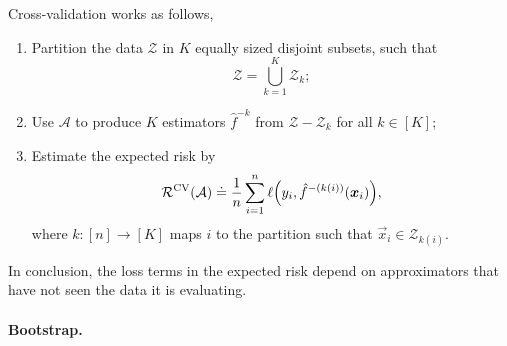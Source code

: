 Cross-validation works as follows,
\begin{enumerate}
    \item Partition the data $\mathcal{Z}$ in $K$ equally sized disjoint subsets, such that \[
              \mathcal{Z} = \bigcup_{k=1}^K \mathcal{Z}_k;
          \]
    \item Use $\mathcal{A}$ to produce $K$ estimators $\hat{f}^{-k}$ from $\mathcal{Z} - \mathcal{Z}_k$ for
          all $k \in [K]$;
    \item Estimate the expected risk by \[
              \mathcal{R}^{\mathrm{CV}}(\mathcal{A}) \doteq \frac{1}{n} \sum_{i=1}^{n} \ell\lft(y_i, \hat{f}^{-(k(i))}(\vec{x}_i)\rgt),
          \]
          where $k: [n] \to [K]$ maps $i$ to the partition such that $\vec{x}_i \in \mathcal{Z}_{k(i)}$.
\end{enumerate}
In conclusion, the loss terms in the expected risk depend on approximators that have not seen the data it is evaluating.

\paragraph{Bootstrap.}

